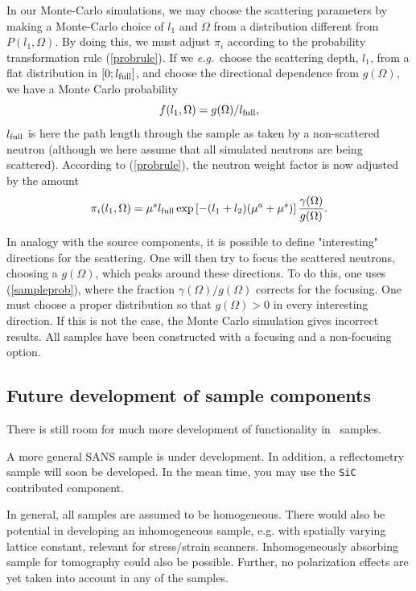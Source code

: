 In our Monte-Carlo simulations, we may choose the scattering
parameters by making a Monte-Carlo choice of $l_1$ and $\Omega$
from a distribution different from $P(l_1,\Omega)$.
By doing this, we must adjust $\pi_i$ according to
the probability transformation rule (\ref{probrule}).
If we {\em e.g.}\ choose the scattering depth, $l_1$,
from a flat distribution in $[ 0 ; l_{\rm full} ]$,
and choose the directional dependence from $g(\Omega)$,
we have a Monte Carlo probability
\begin{equation}
f(l_1,\Omega) = g(\Omega) / l_{\rm full} ,
\end{equation}
$l_{\rm full}$ is here the path length through the sample
as taken by a non-scattered neutron (although we here
assume that all simulated neutrons are being scattered).
According to (\ref{probrule}), the neutron weight factor
is now adjusted by the amount
\begin{equation}     \label{sampleprob}
\pi_i(l_1,\Omega) =
 \mu^s l_{\rm full} \exp \left[ - (l_1+l_2) (\mu^a + \mu^s) \right]
  \frac{\gamma(\Omega)}{g(\Omega)} .
\end{equation}

In analogy with the source components, it is possible to define
"interesting" directions for the scattering.
One will then try to focus the scattered neutrons,
choosing a $g(\Omega)$, which peaks around these directions.
To do this, one uses (\ref{sampleprob}), where the
fraction $\gamma(\Omega)/g(\Omega)$ corrects for the focusing.
One must choose a proper distribution so that
$g(\Omega) > 0$ in every interesting direction. If this is not the
case, the Monte Carlo simulation gives incorrect results.
All samples have been constructed with a focusing
and a non-focusing option.


\subsection{Future development of sample components}
There is still room for much more development of functionality in
\MCS\ samples.

A more general SANS sample is under development.
In addition, a reflectometry sample will soon be developed. In the mean time, you may use the \verb+SiC+ contributed component.

In general, all samples are assumed to be homogeneous. There would also be
potential in developing an inhomogeneous sample, e.g. with
spatially varying lattice constant, relevant for stress/strain scanners.
Inhomogeneously absorbing sample for tomography could also be possible.
Further, no polarization effects are yet taken into account in any
of the samples.


         \newpage
          \newpage
   \newpage
             \newpage
           \newpage

